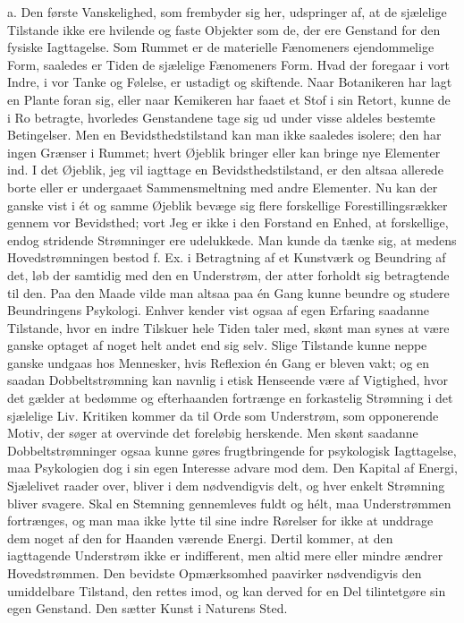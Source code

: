\documentclass[12pt,a4paper,openany]{book}
\newcommand{\opage}[1]{\marginnote{\footnotesize\textit{[#1]}}}
\begin{document}
\opage{19}a. Den første Vanskelighed, som frembyder sig her, udspringer
af, at de sjælelige Tilstande ikke ere hvilende og faste Objekter som
de, der ere Genstand for den fysiske Iagttagelse. Som Rummet er de
materielle Fænomeners ejendommelige Form, saaledes er Tiden de sjælelige
Fænomeners Form. Hvad der foregaar i vort Indre, i vor Tanke og Følelse,
er ustadigt og skiftende. Naar Botanikeren har lagt en Plante foran sig,
eller naar Kemikeren har faaet et Stof i sin Retort, kunne de i Ro
betragte, hvorledes Genstandene tage sig ud under visse aldeles bestemte
Betingelser. Men en Bevidsthedstilstand kan man ikke saaledes isolere;
den har ingen Grænser i Rummet; hvert Øjeblik bringer eller kan bringe
nye Elementer ind. I det Øjeblik, jeg vil iagttage en
Bevidsthedstilstand, er den altsaa allerede borte eller er undergaaet
Sammensmeltning med andre Elementer. Nu kan der ganske vist i ét og
samme Øjeblik bevæge sig flere forskellige Forestillingsrækker gennem
vor Bevidsthed; vort Jeg er ikke i den Forstand en Enhed, at
forskellige, endog stridende Strømninger ere udelukkede. Man kunde da
tænke sig, at medens Hovedstrømningen bestod f. Ex. i Betragtning af et
Kunstværk og Beundring af det, løb der samtidig med den en Understrøm,
der atter forholdt sig betragtende til den. Paa den Maade vilde man
altsaa paa én Gang kunne beundre og studere Beundringens Psykologi.
Enhver kender vist ogsaa af egen Erfaring saadanne Tilstande, hvor en
indre Tilskuer hele Tiden taler med, skønt man synes at være ganske
optaget af noget helt andet end sig selv. Slige Tilstande kunne neppe
ganske undgaas hos Mennesker, hvis Reflexion én Gang er bleven vakt; og
en saadan Dobbeltstrømning kan navnlig i etisk Henseende være af
Vigtighed, hvor det gælder at bedømme og efterhaanden fortrænge en
forkastelig Strømning i det sjælelige Liv. Kritiken kommer da til Orde
som Understrøm, som opponerende Motiv, der søger at overvinde det
foreløbig herskende. Men skønt saadanne Dobbeltstrømninger ogsaa kunne
gøres frugtbringende
\opage{20}for psykologisk Iagttagelse, maa Psykologien dog i sin egen
Interesse advare mod dem. Den Kapital af Energi, Sjælelivet raader over,
bliver i dem nødvendigvis delt, og hver enkelt Strømning bliver svagere.
Skal en Stemning gennemleves fuldt og hélt, maa Understrømmen
fortrænges, og man maa ikke lytte til sine indre Rørelser for ikke at
unddrage dem noget af den for Haanden værende Energi. Dertil kommer, at
den iagttagende Understrøm ikke er indifferent, men altid mere eller
mindre ændrer Hovedstrømmen. Den bevidste Opmærksomhed paavirker
nødvendigvis den umiddelbare Tilstand, den rettes imod, og kan derved
for en Del tilintetgøre sin egen Genstand. Den sætter Kunst i Naturens
Sted.
\end{document}
